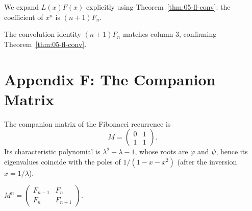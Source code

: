 We expand $L(x) F(x)$ explicitly using
Theorem~\ref{thm:05-fl-conv}: the coefficient of $x^n$ is $(n+1) F_n$.


The convolution identity $(n+1) F_n$ matches column 3, confirming
Theorem~\ref{thm:05-fl-conv}.

\section*{Appendix F: The Companion Matrix}
\label{sec:05-app-F}

The companion matrix of the Fibonacci recurrence is
\[
  M = \begin{pmatrix} 0 & 1 \\ 1 & 1 \end{pmatrix}.
\]
Its characteristic polynomial is $\lambda^2 - \lambda - 1$, whose
roots are $\varphi$ and $\psi$, hence its eigenvalues coincide with
the poles of $1/(1 - x - x^2)$ (after the inversion $x = 1/\lambda$).

\begin{lemma}
\label{lem:05-matrix-power}
$M^n = \begin{pmatrix} F_{n-1} & F_n \\ F_n & F_{n+1} \end{pmatrix}$.
\end{lemma}

